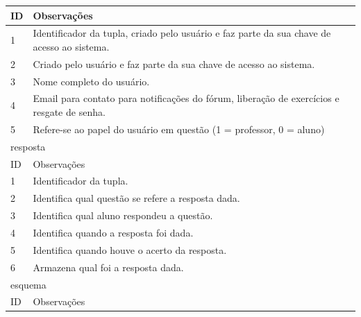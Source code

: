\documentclass[graduacao,brazil]{ThesisPUC}
\begin{document}
\begin{table}[H]
{\begin{tabular}{|l|l|}
    ID                      & Observações                                                                                           \\ \hline
    1                       & Identificador da tupla, criado pelo usuário e faz parte da sua chave de acesso ao sistema.            \\ \hline
    2                       & Criado pelo usuário e faz parte da sua chave de acesso ao sistema.                                    \\ \hline
    3                       & Nome completo do usuário.                                                                             \\ \hline
    4                       & Email para contato para notificações do fórum, liberação de exercícios e resgate de senha.            \\ \hline
    5                       & Refere-se ao papel do usuário em questão (1 = professor, 0 = aluno)                                   \\ \hline
    \multicolumn{2}{|l|}{resposta} \\ \hline
    ID                      & Observações                                                                                           \\ \hline
    1                       & Identificador da tupla.                                                                               \\ \hline
    2                       & Identifica qual questão se refere a resposta dada.                                                    \\ \hline
    3                       & Identifica qual aluno respondeu a questão.                                                            \\ \hline
    4                       & Identifica quando a resposta foi dada.                                                                \\ \hline
    5                       & Identifica quando houve o acerto da resposta.                                                         \\ \hline
    6                       & Armazena qual foi a resposta dada.                                                                    \\ \hline
    \multicolumn{2}{|l|}{esquema} \\ \hline
    ID                      & Observações                                                                                           \\ \hline

\end{tabular}}
\end{table}
\end{document}
